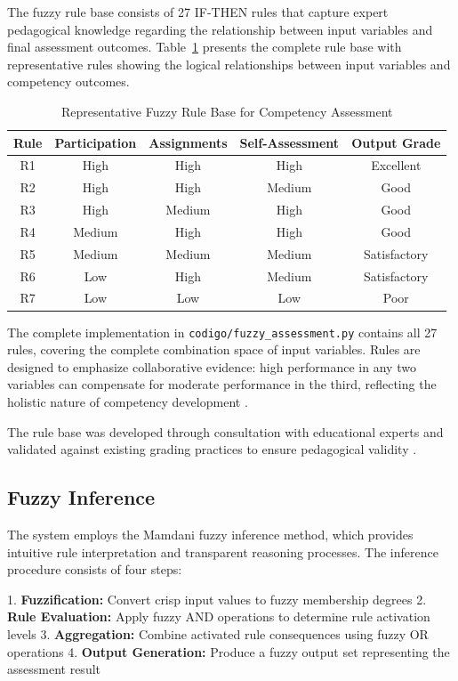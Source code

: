 The fuzzy rule base consists of 27 IF-THEN rules that capture expert pedagogical knowledge regarding the relationship between input variables and final assessment outcomes. Table~\ref{tab:rulebase} presents the complete rule base with representative rules showing the logical relationships between input variables and competency outcomes.

\begin{table}[htbp]
\caption{Representative Fuzzy Rule Base for Competency Assessment}
\label{tab:rulebase}
\centering
\begin{tabular}{|c|c|c|c|c|}
\hline
\textbf{Rule} & \textbf{Participation} & \textbf{Assignments} & \textbf{Self-Assessment} & \textbf{Output Grade} \\
\hline
R1 & High & High & High & Excellent \\
R2 & High & High & Medium & Good \\
R3 & High & Medium & High & Good \\
R4 & Medium & High & High & Good \\
R5 & Medium & Medium & Medium & Satisfactory \\
R6 & Low & High & Medium & Satisfactory \\
R7 & Low & Low & Low & Poor \\
\hline
\end{tabular}
\end{table}

The complete implementation in \texttt{codigo/fuzzy\_assessment.py} contains all 27 rules, covering the complete combination space of input variables. Rules are designed to emphasize collaborative evidence: high performance in any two variables can compensate for moderate performance in the third, reflecting the holistic nature of competency development \cite{Garcia2024}.

The rule base was developed through consultation with educational experts and validated against existing grading practices to ensure pedagogical validity \cite{Garcia2024}.

\subsection{Fuzzy Inference}

The system employs the Mamdani fuzzy inference method, which provides intuitive rule interpretation and transparent reasoning processes. The inference procedure consists of four steps:

1. \textbf{Fuzzification:} Convert crisp input values to fuzzy membership degrees
2. \textbf{Rule Evaluation:} Apply fuzzy AND operations to determine rule activation levels
3. \textbf{Aggregation:} Combine activated rule consequences using fuzzy OR operations  
4. \textbf{Output Generation:} Produce a fuzzy output set representing the assessment result

